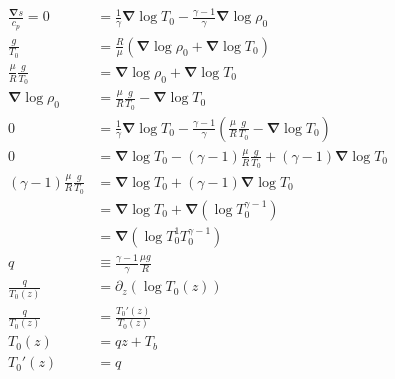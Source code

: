 \documentclass[10pt]{article}
\renewcommand{\vec}[1]{\boldsymbol{#1}}
\newcommand{\grad}{\vec{\nabla}}
\begin{document}
\begin{align*}
  \frac{\grad s}{c_p} = 0 &= \frac{1}{\gamma} \grad \log T_0 - \frac{\gamma - 1}{\gamma}\grad \log \rho_0 \\
  \frac{g}{T_0} &= \frac{R}{\mu}\left( \grad \log \rho_0 + \grad \log T_0 \right) \\
  \frac{\mu}{R}\frac{g}{T_0} &= \grad \log \rho_0 + \grad \log T_0 \\
  \grad \log \rho_0 &= \frac{\mu}{R}\frac{g}{T_0} - \grad \log T_0  \\
  0 &= \frac{1}{\gamma} \grad \log T_0 - \frac{\gamma - 1}{\gamma} \left( \frac{\mu}{R}\frac{g}{T_0} - \grad \log T_0 \right) \\
  0 &= \grad \log T_0 - (\gamma - 1) \frac{\mu}{R}\frac{g}{T_0} + (\gamma - 1)\grad \log T_0 \\
  (\gamma - 1) \frac{\mu}{R}\frac{g}{T_0} &= \grad \log T_0 + (\gamma - 1)\grad \log T_0 \\
  &= \grad \log T_0 + \grad (\log T_0^{\gamma - 1}) \\
  &= \grad (\log T_0^1T_0^{\gamma - 1}) \\
  q &\equiv \frac{\gamma - 1}{\gamma} \frac{\mu g}{R} \\
  \frac{q}{T_0(z)} &= \partial_z (\log T_0(z)) \\
  \frac{q}{T_0(z)} &= \frac{T_0'(z)}{T_0(z)} \\
  T_0(z) &= q z + T_b\\
  T_0'(z) &= q \\
\end{align*}
\end{document}
